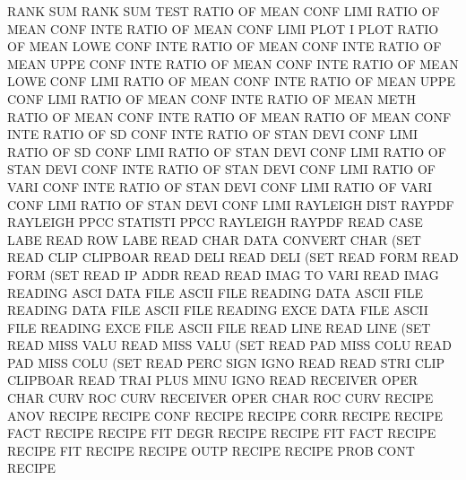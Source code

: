RANK     SUM                            RANK     SUM  TEST
RATIO    OF   MEAN CONF LIMI            RATIO    OF   MEAN CONF INTE
RATIO    OF   MEAN CONF LIMI PLOT       I        PLOT
RATIO    OF   MEAN LOWE CONF INTE       RATIO    OF   MEAN CONF INTE
RATIO    OF   MEAN UPPE CONF INTE       RATIO    OF   MEAN CONF INTE
RATIO    OF   MEAN LOWE CONF LIMI       RATIO    OF   MEAN CONF INTE
RATIO    OF   MEAN UPPE CONF LIMI       RATIO    OF   MEAN CONF INTE
RATIO    OF   MEAN METH                 RATIO    OF   MEAN CONF INTE
RATIO    OF   MEAN                      RATIO    OF   MEAN CONF INTE
RATIO    OF   SD   CONF INTE            RATIO    OF   STAN DEVI CONF LIMI
RATIO    OF   SD   CONF LIMI            RATIO    OF   STAN DEVI CONF LIMI
RATIO    OF   STAN DEVI CONF INTE       RATIO    OF   STAN DEVI CONF LIMI
RATIO    OF   VARI CONF INTE            RATIO    OF   STAN DEVI CONF LIMI
RATIO    OF   VARI CONF LIMI            RATIO    OF   STAN DEVI CONF LIMI
RAYLEIGH DIST                           RAYPDF
RAYLEIGH PPCC                           STATISTI PPCC
RAYLEIGH                                RAYPDF
READ     CASE LABE                      READ     ROW  LABE
READ     CHAR DATA                      CONVERT  CHAR (SET
READ     CLIP                           CLIPBOAR
READ     DELI                           READ     DELI (SET
READ     FORM                           READ     FORM (SET
READ     IP   ADDR                      READ
READ     IMAG TO   VARI                 READ     IMAG
READING  ASCI DATA FILE                 ASCII    FILE
READING  DATA                           ASCII    FILE
READING  DATA FILE                      ASCII    FILE
READING  EXCE DATA FILE                 ASCII    FILE
READING  EXCE FILE                      ASCII    FILE
READ     LINE                           READ     LINE (SET
READ     MISS VALU                      READ     MISS VALU (SET
READ     PAD  MISS COLU                 READ     PAD  MISS COLU (SET
READ     PERC SIGN IGNO                 READ
READ     STRI CLIP                      CLIPBOAR
READ     TRAI PLUS MINU IGNO            READ
RECEIVER OPER CHAR CURV                 ROC      CURV
RECEIVER OPER CHAR                      ROC      CURV
RECIPE   ANOV                           RECIPE
RECIPE   CONF                           RECIPE
RECIPE   CORR                           RECIPE
RECIPE   FACT                           RECIPE
RECIPE   FIT  DEGR                      RECIPE
RECIPE   FIT  FACT                      RECIPE
RECIPE   FIT                            RECIPE
RECIPE   OUTP                           RECIPE
RECIPE   PROB CONT                      RECIPE
